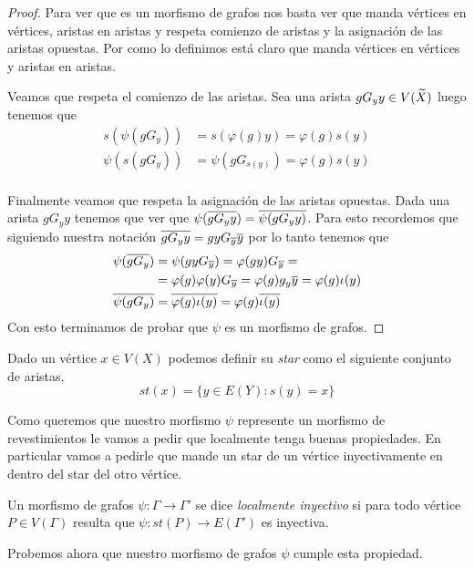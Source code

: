 \documentclass[tesis.tex]{subfiles}
\begin{document}
\begin{proof}
Para ver que es un morfismo de grafos nos basta ver que manda vértices en vértices, aristas en aristas y respeta comienzo de aristas y la asignación de las aristas opuestas.
Por como lo definimos está claro que manda vértices en vértices y aristas en aristas.

Veamos que respeta el comienzo de las aristas.
Sea una arista $gG_y y \in V(\widetilde X)$ luego tenemos que 
\begin{align*}
s(\psi(gG_y  )) &= s (\varphi(g)  y) =  \varphi(g) s(y) 	\\ 
\psi(s(gG_y ))  &= \psi(gG_{s(y)} ) = \varphi(g){s(y)} \\
\end{align*}	

Finalmente veamos que respeta la asignación de las aristas opuestas.	
Dada una arista $g G_y y$ tenemos que ver que $\psi(\overline{g G_y y}) = \overline{\psi(g G_y y)}$.	
Para esto recordemos que siguiendo nuestra notación $\overline{g G_y y} = gyG_{\overline y} \overline y $ por lo tanto tenemos que 
\begin{align*}
\psi(\overline{gG_y  }) &= \psi(gyG_{\overline y}) = \varphi(gy) G_{\overline y}  =         \\ 
&= \varphi(g)\varphi(y) G_{\overline y}  = \varphi(g) g_y \overline y = \varphi(g) \iota(y) \\
\overline{\psi(gG_y )} &= \overline{ \varphi(g) \iota(y) } = \varphi(g) \overline{ \iota(y)} 
\end{align*}
Con esto terminamos de probar que $\psi$ es un morfismo de grafos.
\end{proof}


Dado un vértice $x \in V(X)$ podemos definir su \emph{star} como el siguiente conjunto de aristas,
\[
	st(x) = \{  y \in E(Y) : s(y) = x  \}
\]

Como queremos que nuestro morfismo $\psi$ represente un morfismo de revestimientos le vamos a pedir que localmente tenga buenas propiedades. 
En particular vamos a pedirle que mande un star de un vértice inyectivamente en dentro del star del otro vértice.

\begin{deff}
	Un morfismo de grafos $\psi:\Gamma \to \Gamma'$ se dice \emph{localmente inyectivo} si para todo vértice $P \in V(\Gamma)$ resulta que $\psi: st(P) \to E(\Gamma')$ es inyectiva. 
\end{deff}

Probemos ahora que nuestro morfismo de grafos $\psi$ cumple esta propiedad.
\end{document}

